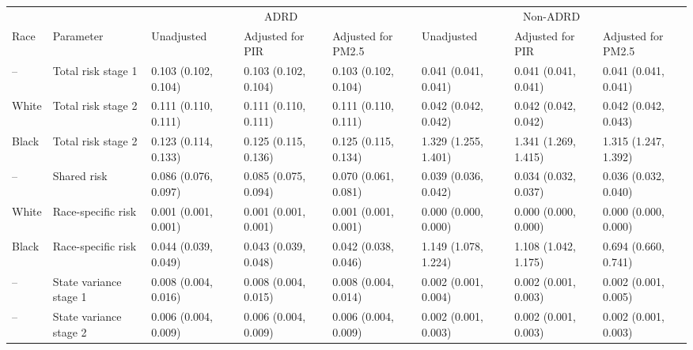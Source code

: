 
\begin{tabular}{llllllll}
\toprule
\multicolumn{2}{c}{ } & \multicolumn{3}{c}{ADRD} & \multicolumn{3}{c}{Non-ADRD} \\
\cmidrule(l{3pt}r{3pt}){3-5} \cmidrule(l{3pt}r{3pt}){6-8}
Race & Parameter & Unadjusted & Adjusted for PIR & Adjusted for PM2.5 & Unadjusted & Adjusted for PIR & Adjusted for PM2.5\\
\midrule
-- & Total risk stage 1 & 0.103 (0.102, 0.104) & 0.103 (0.102, 0.104) & 0.103 (0.102, 0.104) & 0.041 (0.041, 0.041) & 0.041 (0.041, 0.041) & 0.041 (0.041, 0.041)\\
White & Total risk stage 2 & 0.111 (0.110, 0.111) & 0.111 (0.110, 0.111) & 0.111 (0.110, 0.111) & 0.042 (0.042, 0.042) & 0.042 (0.042, 0.042) & 0.042 (0.042, 0.043)\\
Black & Total risk stage 2 & 0.123 (0.114, 0.133) & 0.125 (0.115, 0.136) & 0.125 (0.115, 0.134) & 1.329 (1.255, 1.401) & 1.341 (1.269, 1.415) & 1.315 (1.247, 1.392)\\
-- & Shared risk & 0.086 (0.076, 0.097) & 0.085 (0.075, 0.094) & 0.070 (0.061, 0.081) & 0.039 (0.036, 0.042) & 0.034 (0.032, 0.037) & 0.036 (0.032, 0.040)\\
White & Race-specific risk & 0.001 (0.001, 0.001) & 0.001 (0.001, 0.001) & 0.001 (0.001, 0.001) & 0.000 (0.000, 0.000) & 0.000 (0.000, 0.000) & 0.000 (0.000, 0.000)\\
\addlinespace
Black & Race-specific risk & 0.044 (0.039, 0.049) & 0.043 (0.039, 0.048) & 0.042 (0.038, 0.046) & 1.149 (1.078, 1.224) & 1.108 (1.042, 1.175) & 0.694 (0.660, 0.741)\\
-- & State variance stage 1 & 0.008 (0.004, 0.016) & 0.008 (0.004, 0.015) & 0.008 (0.004, 0.014) & 0.002 (0.001, 0.004) & 0.002 (0.001, 0.003) & 0.002 (0.001, 0.005)\\
-- & State variance stage 2 & 0.006 (0.004, 0.009) & 0.006 (0.004, 0.009) & 0.006 (0.004, 0.009) & 0.002 (0.001, 0.003) & 0.002 (0.001, 0.003) & 0.002 (0.001, 0.003)\\
\bottomrule
\end{tabular}
